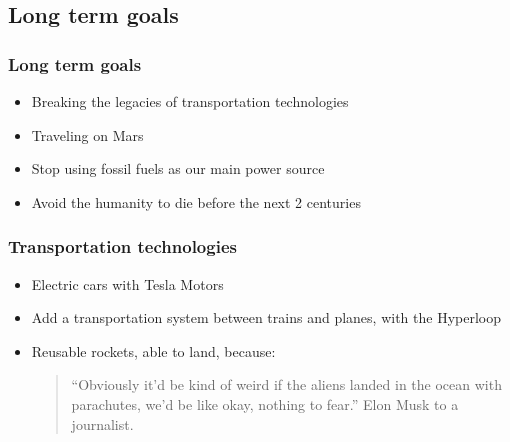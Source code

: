 \subsection{Long term goals}
\begin{frame}
\frametitle{Long term goals}
\begin{itemize}
    \itemsep1.5em
    \item Breaking the legacies of transportation technologies
    \item Traveling on Mars
    \item Stop using fossil fuels as our main power source
    \item Avoid the humanity to die before the next 2 centuries
\end{itemize}
\end{frame}


\begin{frame}
\frametitle{Transportation technologies}
\begin{itemize}
    \itemsep1em
    \item Electric cars with Tesla Motors
    \item Add a transportation system between trains and planes, with the
        Hyperloop
    \item Reusable rockets, able to land, because:
        \begin{quote}
            ``Obviously it'd be kind of weird if the aliens landed in the ocean
            with parachutes, we'd be like okay, nothing to fear.'' Elon Musk to
            a journalist.
        \end{quote}
\end{itemize}
\end{frame}
